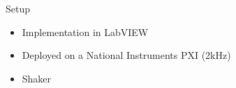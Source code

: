 \documentclass[10pt]{beamer}
\begin{document}
\begin{frame}{Setup}
  \begin{itemize}
    \item Implementation in LabVIEW
    \item Deployed on a National Instruments PXI (2kHz)
    \item Shaker
  \end{itemize}
  \begin{figure}[h]
    \centering
  \end{figure}
\end{frame}
\end{document}

